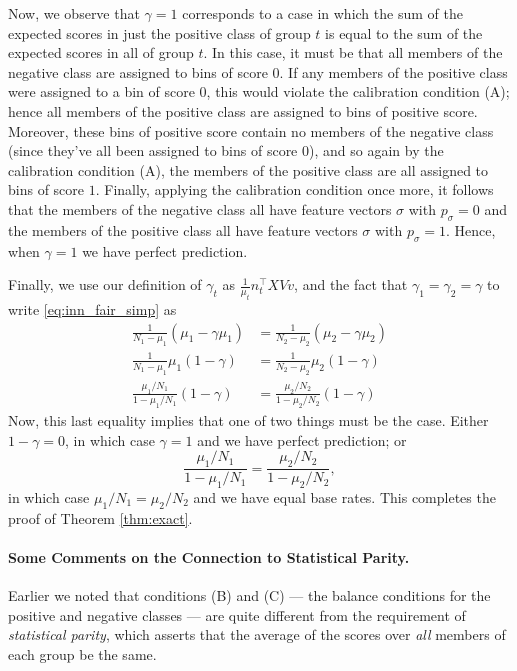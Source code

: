 \documentclass[11pt]{article}
\newcommand{\xhdr}[1]{\vspace{-0.2in} \paragraph*{\bf {#1}.}}
\def\tran{^{\top}}
\begin{document}
Now, we observe that $\gamma = 1$ corresponds to a case in which 
the sum of the expected scores in just the positive class of group $t$
is equal to the sum of the expected scores in all of group $t$.
In this case, it must be that all members of the negative class are
assigned to bins of score $0$.
If any members of the positive class were assigned to a bin of score $0$,
this would violate the calibration condition (A); hence
all members of the positive class are assigned to bins of positive score.
Moreover, these bins of positive score contain no members of the negative
class (since they've all been assigned to bins of score $0$), and so
again by the calibration condition (A), the members of the positive class
are all assigned to bins of score $1$.
Finally, applying the calibration condition once more, it follows that
the members of the negative class all have feature vectors $\sigma$
with $p_\sigma = 0$ and 
the members of the positive class all have feature vectors $\sigma$
with $p_\sigma = 1$.
Hence, when $\gamma = 1$ we have perfect prediction.

Finally, we use our definition of $\gamma_t$ as 
$\displaystyle{\frac{1}{\mu_t} n_t\tran XVv}$, and the fact that
$\gamma_1 = \gamma_2 = \gamma$ to write \eqref{eq:inn_fair_simp} as 
\begin{align*}
  \frac{1}{N_1-\mu_1} (\mu_1 - \gamma \mu_1) &= \frac{1}{N_2-\mu_2} (\mu_2 - \gamma \mu_2) \\
  \frac{1}{N_1-\mu_1} \mu_1 (1 - \gamma) &= \frac{1}{N_2-\mu_2} \mu_2 (1 - \gamma) \\
  \frac{\mu_1/N_1}{1-\mu_1/N_1} (1 - \gamma) &= \frac{\mu_2/N_2}{1-\mu_2/N_2} (1 - \gamma)
\end{align*}
Now, this last equality implies that one of two things must be the case.
Either $1 - \gamma = 0$, in which case $\gamma = 1$ and we have 
perfect prediction; 
or 
$$\displaystyle{\frac{\mu_1/N_1}{1-\mu_1/N_1}}
= \displaystyle{\frac{\mu_2/N_2}{1-\mu_2/N_2}},$$ in which case 
$\mu_1/N_1 = \mu_2/N_2$
and we have equal base rates.
This completes the proof of Theorem \ref{thm:exact}.


\xhdr{Some Comments on the Connection to Statistical Parity}
Earlier we noted that conditions (B) and (C) --- the balance conditions
for the positive and negative classes --- are quite different from the
requirement of {\em statistical parity}, which asserts that the average
of the scores over {\em all} members of each group 
be the same.
\end{document}
